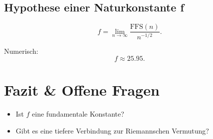 \documentclass[a4paper,12pt]{article}
\begin{document}
\subsection{Hypothese einer Naturkonstante f}
\begin{equation}
    f = \lim_{n \to \infty} \frac{\text{FFS}(n)}{n^{-1/2}}.
\end{equation}

Numerisch:
\begin{equation}
    f \approx 25.95.
\end{equation}

\newpage
\section{Fazit \& Offene Fragen}
\begin{itemize}
    \item Ist $f$ eine fundamentale Konstante?
    \item Gibt es eine tiefere Verbindung zur Riemannschen Vermutung?
\end{itemize}
\end{document}
